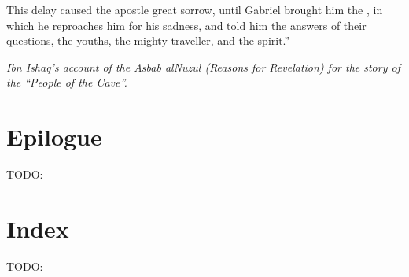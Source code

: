 \documentclass[12pt]{memoir}
\begin{document}
This delay caused the apostle great sorrow,
until Gabriel brought him the ,
in which he reproaches him for his sadness,
and told him the answers of their questions, the youths,
the mighty traveller, and the spirit.”

\emph{Ibn Ishaq's account of the Asbab al\–Nuzul
(Reasons for Revelation) for the story of the “People of the Cave”.}


\backmatter

\chapter{Epilogue}
TODO:

\chapter{Index}
TODO:
\end{document}
